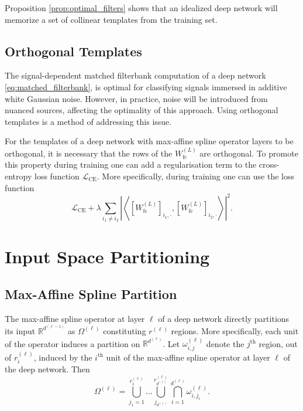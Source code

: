 \begin{remark}
    Proposition \ref{prop:optimal_filters} shows that an idealized deep network will memorize a set of collinear templates from the training set.
\end{remark}

\subsection{Orthogonal Templates}

The signal-dependent matched filterbank computation of a deep network \eqref{eq:matched_filterbank}, is optimal for classifying signals immersed in additive white Gaussian noise. However, in practice, noise will be introduced from nuanced sources, affecting the optimality of this approach. Using orthogonal templates is a method of addressing this issue.

For the templates of a deep network with max-affine spline operator layers to be orthogonal, it is necessary that the rows of the $W^{(L)}_{\text{fc}}$ are orthogonal. To promote this property during training one can add a regularisation term to the cross-entropy loss function $\mathcal{L}_{\text{CE}}$. More specifically, during training one can use the loss function $$\mathcal{L}_{\text{CE}}+\lambda\sum_{i_1\neq i_2}\left\vert\left\langle\left[W^{(L)}_{\text{fc}}\right]_{i_1,\cdot},\left[W_{\text{fc}}^{(L)}\right]_{i_2,\cdot}\right\rangle\right\vert^2.$$

\section{Input Space Partitioning}\label{sec:input_space_partitioning}

\subsection{Max-Affine Spline Partition}

The max-affine spline operator at layer $\ell$ of a deep network directly partitions its input $\mathbb{R}^{d^{(\ell-1)}}$ as $\Omega^{(\ell)}$ constituting $r^{(\ell)}$ regions. More specifically, each unit of the operator induces a partition on $\mathbb{R}^{d^{(\ell)}}$. Let $\omega_{i,j}^{(\ell)}$ denote the $j^\text{th}$ region, out of $r^{(\ell)}_i$, induced by the $i^\text{th}$ unit of the max-affine spline operator at layer $\ell$ of the deep network. Then $$\Omega^{(\ell)}=\bigcup_{j_1=1}^{r^{(\ell)}_1}\dots\bigcup_{j_{d^{(\ell)}}}^{r^{(\ell)}_{d^{(\ell)}}}\bigcap_{i=1}^{d^{(\ell)}}\omega_{i,j_i}^{(\ell)}.$$

